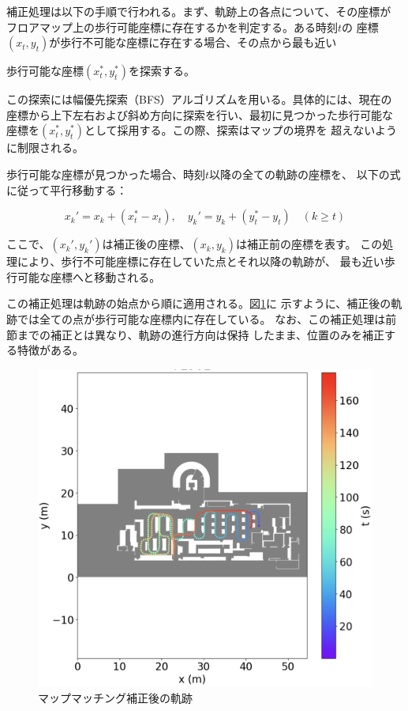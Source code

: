 補正処理は以下の手順で行われる。まず、軌跡上の各点について、その座標が
フロアマップ上の歩行可能座標に存在するかを判定する。ある時刻$t$の
座標$(x_t, y_t)$が歩行不可能な座標に存在する場合、その点から最も近い

歩行可能な座標$(x_t^*, y_t^*)$を探索する。

この探索には幅優先探索（BFS）アルゴリズムを用いる。具体的には、現在の
座標から上下左右および斜め方向に探索を行い、最初に見つかった歩行可能な
座標を$(x_t^*, y_t^*)$として採用する。この際、探索はマップの境界を
超えないように制限される。

歩行可能な座標が見つかった場合、時刻$t$以降の全ての軌跡の座標を、
以下の式に従って平行移動する：

\begin{equation}
x_k' = x_k + (x_t^* - x_t), \quad y_k' = y_k + (y_t^* - y_t) \quad (k \geq t)
\end{equation}

ここで、$(x_k', y_k')$は補正後の座標、$(x_k, y_k)$は補正前の座標を表す。
この処理により、歩行不可能座標に存在していた点とそれ以降の軌跡が、
最も近い歩行可能な座標へと移動される。

この補正処理は軌跡の始点から順に適用される。図\ref{fig:map-matching}に
示すように、補正後の軌跡では全ての点が歩行可能な座標内に存在している。
なお、この補正処理は前節までの補正とは異なり、軌跡の進行方向は保持
したまま、位置のみを補正する特徴がある。

\begin{figure}[H]
    \centering
    \includegraphics[width=\linewidth]{image/map-matching.jpg}
    \caption{マップマッチング補正後の軌跡}    \label{fig:map-matching}
\end{figure}
